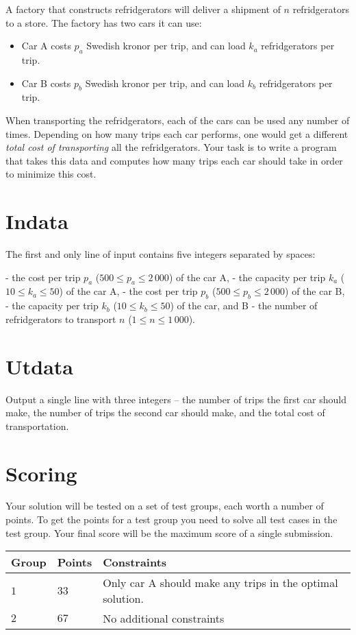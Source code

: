 A factory that constructs refridgerators will deliver a shipment of $n$ refridgerators to a store.
The factory has two cars it can use:
\begin{itemize}
    \item Car A costs $p_a$ Swedish kronor per trip, and can load $k_a$ refridgerators per trip.
    \item Car B costs $p_b$ Swedish kronor per trip, and can load $k_b$ refridgerators per trip.
\end{itemize}

When transporting the refridgerators, each of the cars can be used any number of times.
Depending on how many trips each car performs, one would get a different \emph{total cost of transporting} all the refridgerators.
Your task is to write a program that takes this data and computes how many trips each car should take in order to minimize this cost.

\section*{Indata}
The first and only line of input contains five integers separated by spaces:

- the cost per trip $p_a$ ($500 \le p_a \le 2\,000$) of the car A,
- the capacity per trip $k_a$ ($10 \le k_a \le 50$) of the car A,
- the cost per trip $p_b$ ($500 \le p_b \le 2\,000$) of the car B,
- the capacity per trip $k_b$ ($10 \le k_b \le 50$) of the car, and B
- the number of refridgerators to transport $n$ ($1 \le n \le 1\,000$).

\section*{Utdata}
Output a single line with three integers -- the number of trips the first car should make, the number of trips the second car should make, and the total cost of transportation.

\section*{Scoring}
Your solution will be tested on a set of test groups, each worth a number of points.
To get the points for a test group you need to solve all test cases in the test group. Your final score will be the maximum score of a single submission.

\noindent
\begin{tabular}{| l | l | l |}
  \hline
  Group & Points & Constraints \\ \hline
  $1$    & $33$        &  Only car A should make any trips in the optimal solution. \\ \hline
  $2$    & $67$        &  No additional constraints \\ \hline
\end{tabular}
